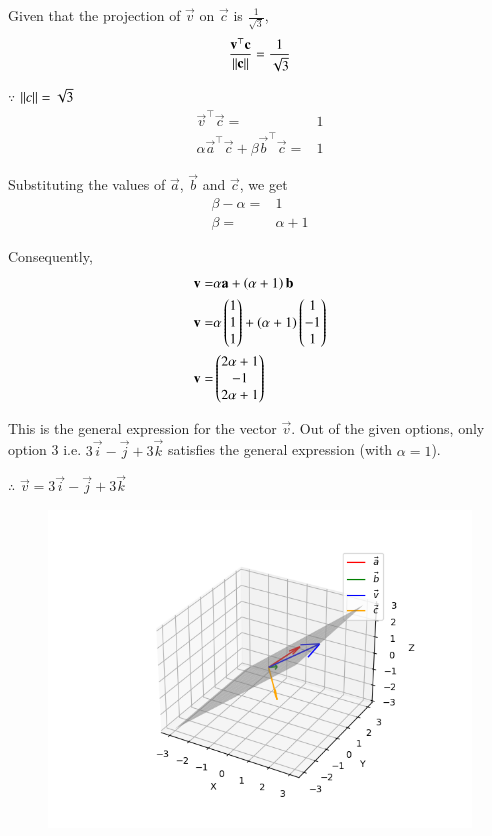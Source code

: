 \documentclass[journal]{IEEEtran}
\begin{document}
Given that the projection of $\vec{v}$ on $\vec{c}$ is $\frac{1}{\sqrt{3}}$, 
\begin{align}
    \frac{\mathbf{v}^\top\mathbf{c}}{\left\lVert\mathbf{c}\right\rVert} = \frac{1}{\sqrt{3}}
\end{align}

$\because$ $\left\lVert c\right\rVert = \sqrt{3}$
\begin{align}
    \vec{v}^\top\vec{c} =& 1\\
    \alpha\vec{a}^\top\vec{c} + \beta\vec{b}^\top\vec{c} =& 1
\end{align}

Substituting the values of $\vec{a}$, $\vec{b}$ and $\vec{c}$, we get
\begin{align}
    \beta-\alpha =& 1\\
    \beta =& \alpha + 1
\end{align}

Consequently,
\begin{align}
    \mathbf{v} =& \alpha\mathbf{a} + \left(\alpha + 1\right)\mathbf{b}\\
    \mathbf{v} =& \alpha\begin{pmatrix}1\\1\\1\end{pmatrix} + \left(\alpha + 1\right)\begin{pmatrix}1\\-1\\1\end{pmatrix}\\
    \mathbf{v} =& \begin{pmatrix}2\alpha+1\\-1\\2\alpha+1\end{pmatrix}
\end{align}

This is the general expression for the vector $\vec{v}$. Out of the given options, only option 3 i.e. $3\vec{i}-\vec{j}+3\vec{k}$ satisfies the general expression (with $\alpha = 1$).

$\therefore$ $\vec{v} = 3\vec{i}-\vec{j}+3\vec{k}$

\begin{figure}[H]
    \centering
    \includegraphics[width=1\columnwidth]{Figs/plot(py).png}
\end{figure}
\end{document}
